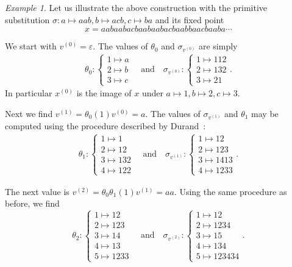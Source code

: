 \documentclass{amsart}
\newcommand*{\from}{\colon}
\newcommand*{\emptyw}{\varepsilon}
\newcommand{\displaysub}[1]{\begin{cases}#1\end{cases}}
\theoremstyle{plain}
\theoremstyle{definition}
\theoremstyle{remark}
\newtheorem{example}[theorem]{Example}
\begin{document}
\begin{example}\label{ex:unimodular-1}
    Let us illustrate the above construction with the primitive substitution $\sigma\from a \mapsto aab, b \mapsto acb, c \mapsto ba$ and its fixed point 
    \[
        x = aabaabacbaabaabacbaabbaacbaaba\cdots
    \]
    
    We start with $v^{(0)}=\emptyw$. The values of $\theta_0$ and $\sigma_{v^{(0)}}$ are simply
    \begin{align*}
        \theta_0 \from\displaysub{1\mapsto a \\ 2\mapsto b \\ 3\mapsto c}
        \quad \text{and}\quad
        \sigma_{v^{(0)}}\from\displaysub{1 \mapsto 112 \\ 2 \mapsto 132 \\ 3 \mapsto 21}.
    \end{align*}
    In particular $x^{(0)}$ is the image of $x$ under $a\mapsto 1, b\mapsto 2, c\mapsto 3$.

    Next we find $v^{(1)} = \theta_0(1)v^{(0)} =a$. The values of $\sigma_{v^{(1)}}$ and $\theta_1$ may be computed using the procedure described by Durand~\cite{Durand2012}:
    \begin{align*}
        \theta_1 \from \displaysub{1\mapsto 1 \\ 2\mapsto 12 \\ 3\mapsto 132 \\ 4\mapsto 122}
        \quad\text{and}\quad
        \sigma_{v^{(1)}} \from \displaysub{1\mapsto 12 \\ 2\mapsto 123 \\ 3\mapsto 1413 \\ 4\mapsto 1233}.
    \end{align*}

    The next value is $v^{(2)}=\theta_0\theta_1(1)v^{(1)} = aa$. Using the same procedure as before, we find
    \[
        \theta_2 \from \displaysub{ 1\mapsto 12 \\ 2\mapsto 123 \\  3\mapsto 14 \\  4\mapsto 13 \\  5\mapsto 1233 }
            \quad\text{and}\quad
        \sigma_{v^{(2)}} \from \displaysub{ 1\mapsto 12 \\  2\mapsto 1234 \\  3\mapsto 15 \\  4\mapsto 134 \\ 5\mapsto 123434 }.
    \]


\end{example}
\end{document}
